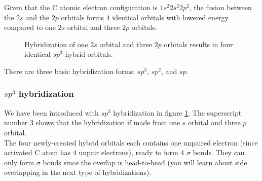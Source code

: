 \documentclass{report}
\begin{document}
			Given that the C atomic electron configuration is $1s^2 2s^2 2p^2$, the fusion between the $2s$ and the $2p$ orbitals forms 4 identical orbitals with lowered energy compared to one $2s$ orbital and three $2p$ orbitals. \\
			\begin{figure}[H]
			\centering
			\captionsetup{justification=centering, margin=2cm}
			\vspace{5mm}
				\setbondoffset{0pt}
				 \hfill
			\ch{->[Hybridization]} \hfill
			\vspace{5mm}
				\setbondoffset{0pt}
				 \vspace{5mm}
			\caption{Hybridization of one $2s$ orbital and three $2p$ orbitals results in four identical $sp^3$ hybrid orbitals.\label{fig:s}}
			
			\end{figure}
			
			There are three basic hybridization forms: $sp^3$, $sp^2$, and $sp$.
			
			\subsubsection{$sp^3$ hybridization}
			We have been introduced with $sp^3$ hybridization in figure \ref{fig:s}. The superscript number 3 shows that the hybridization if made from one $s$ orbital and three $p$ orbital. \\
			
			The four newly-created hybrid orbitals each contains one unpaired electron (since activated C atom has 4 unpair electrons), ready to form 4 $\sigma$ bonds. They can only form $\sigma$ bonds since the overlap is head-to-head (you will learn about side overlapping in the next type of hybridizations). \\
			
\end{document}
